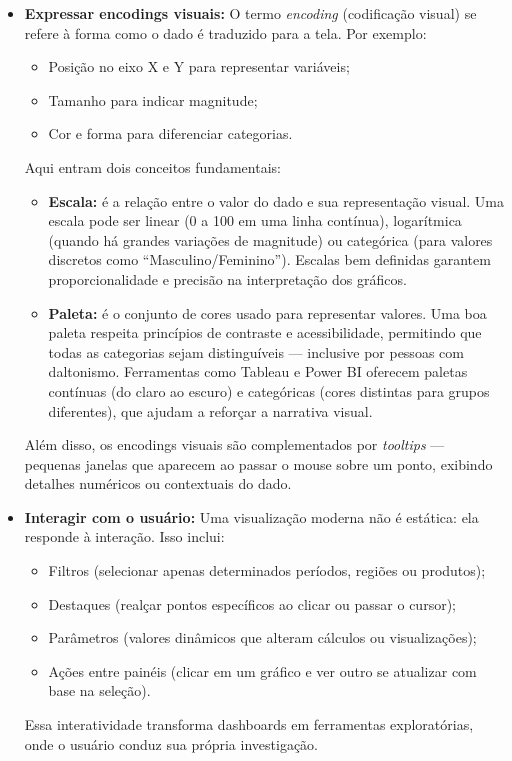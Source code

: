\begin{itemize}[leftmargin=*]
  \item \textbf{Expressar encodings visuais:}  
  O termo \textit{encoding} (codificação visual) se refere à forma como o dado é traduzido para a tela. Por exemplo:
  \begin{itemize}
    \item Posição no eixo X e Y para representar variáveis;
    \item Tamanho para indicar magnitude;
    \item Cor e forma para diferenciar categorias.
  \end{itemize}
  Aqui entram dois conceitos fundamentais:
  \begin{itemize}
    \item \textbf{Escala:} é a relação entre o valor do dado e sua representação visual.  
    Uma escala pode ser linear (0 a 100 em uma linha contínua), logarítmica (quando há grandes variações de magnitude) ou categórica (para valores discretos como “Masculino/Feminino”).  
    Escalas bem definidas garantem proporcionalidade e precisão na interpretação dos gráficos.
    \item \textbf{Paleta:} é o conjunto de cores usado para representar valores.  
    Uma boa paleta respeita princípios de contraste e acessibilidade, permitindo que todas as categorias sejam distinguíveis — inclusive por pessoas com daltonismo.  
    Ferramentas como Tableau e Power BI oferecem paletas contínuas (do claro ao escuro) e categóricas (cores distintas para grupos diferentes), que ajudam a reforçar a narrativa visual.
  \end{itemize}
  Além disso, os encodings visuais são complementados por \textit{tooltips} — pequenas janelas que aparecem ao passar o mouse sobre um ponto, exibindo detalhes numéricos ou contextuais do dado.

  \item \textbf{Interagir com o usuário:}  
  Uma visualização moderna não é estática: ela responde à interação.  
  Isso inclui:
  \begin{itemize}
    \item Filtros (selecionar apenas determinados períodos, regiões ou produtos);
    \item Destaques (realçar pontos específicos ao clicar ou passar o cursor);
    \item Parâmetros (valores dinâmicos que alteram cálculos ou visualizações);
    \item Ações entre painéis (clicar em um gráfico e ver outro se atualizar com base na seleção).  
  \end{itemize}
  Essa interatividade transforma dashboards em ferramentas exploratórias, onde o usuário conduz sua própria investigação.


\end{itemize}
